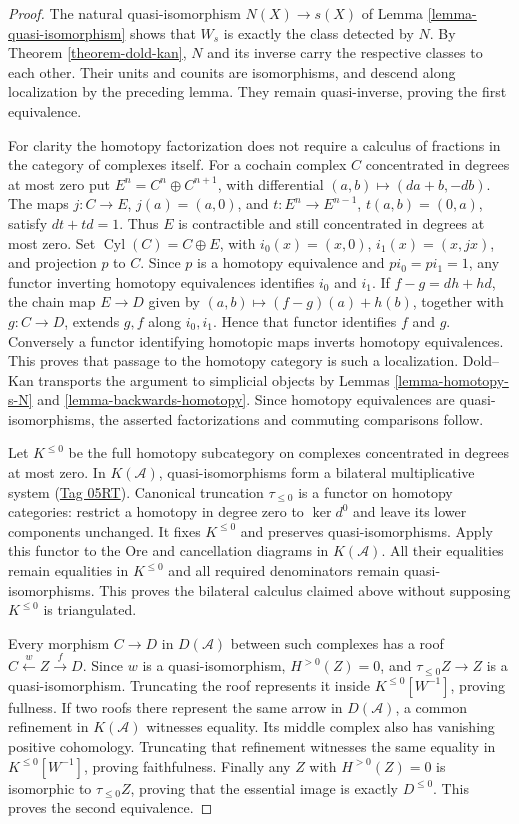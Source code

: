 \begin{proof}
The natural quasi-isomorphism $N(X)\to s(X)$ of
Lemma \ref{lemma-quasi-isomorphism} shows that $W_s$ is exactly the class
detected by $N$. By Theorem \ref{theorem-dold-kan}, $N$ and its inverse
carry the respective classes to each other. Their units and counits are
isomorphisms, and descend along localization by the preceding lemma.
They remain quasi-inverse, proving the first equivalence.

For clarity the homotopy factorization does not require a calculus of
fractions in the category of complexes itself. For a cochain complex $C$
concentrated in degrees at most zero put
$E^n=C^n\oplus C^{n+1}$, with differential $(a,b)\mapsto(d a+b,-d b)$.
The maps $j:C\to E$, $j(a)=(a,0)$, and
$t:E^n\to E^{n-1}$, $t(a,b)=(0,a)$, satisfy $dt+td=1$.
Thus $E$ is contractible and still concentrated in degrees at most zero.
Set $\operatorname{Cyl}(C)=C\oplus E$, with
$i_0(x)=(x,0)$, $i_1(x)=(x,jx)$, and projection $p$ to $C$.
Since $p$ is a homotopy equivalence and $pi_0=pi_1=1$, any functor
inverting homotopy equivalences identifies $i_0$ and $i_1$.
If $f-g=dh+hd$, the chain map $E\to D$ given by
$(a,b)\mapsto(f-g)(a)+h(b)$, together with $g:C\to D$, extends
$g,f$ along $i_0,i_1$. Hence that functor identifies $f$ and $g$.
Conversely a functor identifying homotopic maps inverts homotopy
equivalences. This proves that passage to the homotopy category is such a
localization. Dold--Kan transports the argument to simplicial objects by
Lemmas \ref{lemma-homotopy-s-N} and \ref{lemma-backwards-homotopy}.
Since homotopy equivalences are quasi-isomorphisms, the asserted
factorizations and commuting comparisons follow.

Let $K^{\leq0}$ be the full homotopy subcategory on complexes concentrated
in degrees at most zero. In $K(\mathcal A)$, quasi-isomorphisms form a
bilateral multiplicative system
(\href{https://stacks.math.columbia.edu/tag/05RT}{Tag 05RT}).
Canonical truncation $\tau_{\leq0}$ is a functor on homotopy categories:
restrict a homotopy in degree zero to $\ker d^0$ and leave its lower
components unchanged. It fixes $K^{\leq0}$ and preserves quasi-isomorphisms.
Apply this functor to the Ore and cancellation diagrams in $K(\mathcal A)$.
All their equalities remain equalities in $K^{\leq0}$ and all required
denominators remain quasi-isomorphisms. This proves the bilateral calculus
claimed above without supposing $K^{\leq0}$ is triangulated.

Every morphism $C\to D$ in $D(\mathcal A)$ between such complexes has a
roof $C\xleftarrow{w}Z\xrightarrow{f}D$. Since $w$ is a
quasi-isomorphism, $H^{>0}(Z)=0$, and $\tau_{\leq0}Z\to Z$ is a
quasi-isomorphism. Truncating the roof represents it inside
$K^{\leq0}[W^{-1}]$, proving fullness. If two roofs there represent the
same arrow in $D(\mathcal A)$, a common refinement in $K(\mathcal A)$
witnesses equality. Its middle complex also has vanishing positive
cohomology. Truncating that refinement witnesses the same equality in
$K^{\leq0}[W^{-1}]$, proving faithfulness. Finally any $Z$ with
$H^{>0}(Z)=0$ is isomorphic to $\tau_{\leq0}Z$, proving that the essential
image is exactly $D^{\leq0}$. This proves the second equivalence.
\end{proof}
